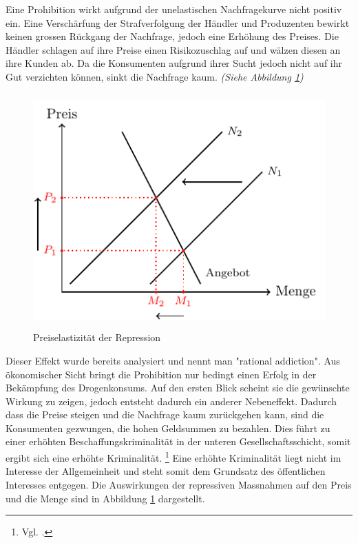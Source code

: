 \documentclass[../main.tex]{subfiles}
\begin{document}
	\noindent
	Eine Prohibition wirkt aufgrund der unelastischen Nachfragekurve nicht positiv ein.
	Eine Verschärfung der Strafverfolgung der Händler und Produzenten bewirkt keinen grossen Rückgang der Nachfrage, jedoch eine Erhöhung des Preises.
	Die Händler schlagen auf ihre Preise einen Risikozuschlag auf und wälzen diesen an ihre Kunden ab.
	Da die Konsumenten aufgrund ihrer Sucht jedoch nicht auf ihr Gut verzichten können, sinkt die Nachfrage kaum.
	\textit{(Siehe Abbildung \ref{fig:repression})}\\
	
	\noindent
	\begin{figure}[H]
		\centering
		\includegraphics[height=9cm]{../figures/priceelasticity-repression}
		\captionsetup{font=small}
		\caption[Preiselastizität der Repression]{Preiselastizität der Repression\protect\footnotemark}		
		\label{fig:repression}
	\end{figure}
	
	\noindent
	Dieser Effekt wurde bereits analysiert und nennt man "rational addiction".
	Aus ökonomischer Sicht bringt die Prohibition nur bedingt einen Erfolg in der Bekämpfung des Drogenkonsums. 
	Auf den ersten Blick scheint sie die gewünschte Wirkung zu zeigen, jedoch entsteht dadurch ein anderer Nebeneffekt. 
	Dadurch dass die Preise steigen und die Nachfrage kaum zurückgehen kann, sind die Konsumenten gezwungen, die hohen Geldsummen zu bezahlen.
	Dies führt zu einer erhöhten Beschaffungskriminalität in der unteren Gesellschaftsschicht, somit ergibt sich eine erhöhte Kriminalität. %
	\footnote{Vgl. \cite{becker}.}
	Eine erhöhte Kriminalität liegt nicht im Interesse der Allgemeinheit und steht somit dem Grundsatz des öffentlichen Interesses entgegen.
	Die Auswirkungen der repressiven Massnahmen auf den Preis und die Menge sind in Abbildung \ref{fig:repression} dargestellt.
	
\end{document}
